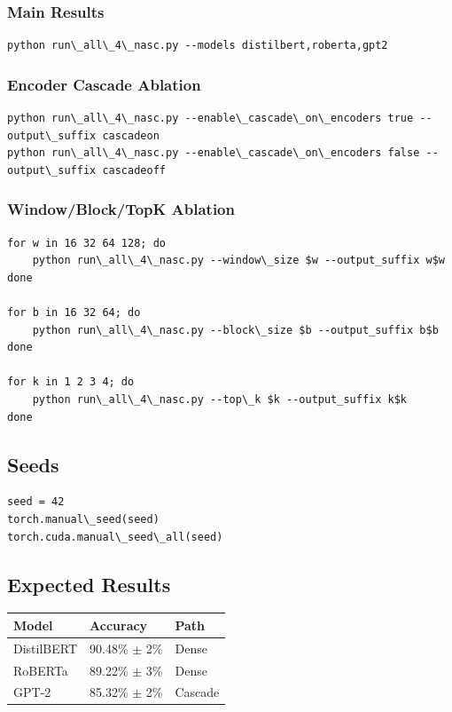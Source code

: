 \subsubsection{Main Results}

\begin{lstlisting}
python run\_all\_4\_nasc.py --models distilbert,roberta,gpt2
\end{lstlisting}

\subsubsection{Encoder Cascade Ablation}

\begin{lstlisting}
python run\_all\_4\_nasc.py --enable\_cascade\_on\_encoders true --output\_suffix cascadeon
python run\_all\_4\_nasc.py --enable\_cascade\_on\_encoders false --output\_suffix cascadeoff
\end{lstlisting}

\subsubsection{Window/Block/TopK Ablation}

\begin{lstlisting}
for w in 16 32 64 128; do
    python run\_all\_4\_nasc.py --window\_size $w --output_suffix w$w
done

for b in 16 32 64; do
    python run\_all\_4\_nasc.py --block\_size $b --output_suffix b$b
done

for k in 1 2 3 4; do
    python run\_all\_4\_nasc.py --top\_k $k --output_suffix k$k
done
\end{lstlisting}

\subsection{Seeds}

\begin{lstlisting}
seed = 42
torch.manual\_seed(seed)
torch.cuda.manual\_seed\_all(seed)
\end{lstlisting}

\subsection{Expected Results}

\begin{table}[H]
\centering
\small
\begin{tabular}{lll}
\toprule
\textbf{Model} & \textbf{Accuracy} & \textbf{Path} \\
\midrule
DistilBERT & 90.48\% $\pm$ 2\% & Dense \\
RoBERTa & 89.22\% $\pm$ 3\% & Dense \\
GPT-2 & 85.32\% $\pm$ 2\% & Cascade \\
\bottomrule
\end{tabular}
\end{table}

